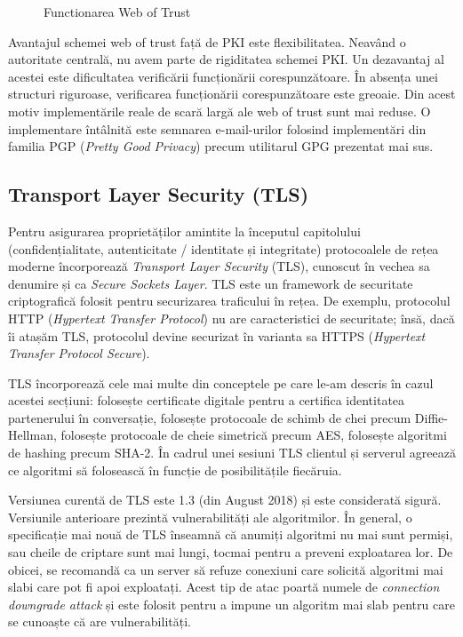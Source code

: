 \begin{figure}[htbp]
  \centering
  \def\svgwidth{\columnwidth}
  
  \caption{Functionarea Web of Trust}
  \label{fig:sec:web-of-trust}
\end{figure}

Avantajul schemei web of trust față de PKI este flexibilitatea. Neavând o autoritate centrală, nu avem parte de rigiditatea schemei PKI. Un dezavantaj al acestei este dificultatea verificării funcționării corespunzătoare. În absența unei structuri riguroase, verificarea funcționării corespunzătoare este greoaie. Din acest motiv implementările reale de scară largă ale web of trust sunt mai reduse. O implementare întâlnită este semnarea e-mail-urilor folosind implementări din familia PGP (\textit{Pretty Good Privacy}) precum utilitarul GPG prezentat mai sus.

\subsection{Transport Layer Security (TLS)}
\label{sec:sec:transfer:tls}

Pentru asigurarea proprietăților amintite la începutul capitolului (confidențialitate, autenticitate / identitate și integritate) protocoalele de rețea moderne încorporează \textit{Transport Layer Security} (TLS), cunoscut în vechea sa denumire și ca \textit{Secure Sockets Layer}. TLS este un framework de securitate criptografică folosit pentru securizarea traficului în rețea. De exemplu, protocolul HTTP (\textit{Hypertext Transfer Protocol}) nu are caracteristici de securitate; însă, dacă îi atașăm TLS, protocolul devine securizat în varianta sa HTTPS (\textit{Hypertext Transfer Protocol Secure}).

TLS încorporează cele mai multe din conceptele pe care le-am descris în cazul acestei secțiuni: folosește certificate digitale pentru a certifica identitatea partenerului în conversație, folosește protocoale de schimb de chei precum Diffie-Hellman, folosește protocoale de cheie simetrică precum AES, folosește algoritmi de hashing precum SHA-2. În cadrul unei sesiuni TLS clientul și serverul agreează ce algoritmi să folosească în funcție de posibilitățile fiecăruia.

Versiunea curentă de TLS este 1.3 (din August 2018) și este considerată sigură. Versiunile anterioare prezintă vulnerabilități ale algoritmilor. În general, o specificație mai nouă de TLS înseamnă că anumiți algoritmi nu mai sunt permiși, sau cheile de criptare sunt mai lungi, tocmai pentru a preveni exploatarea lor. De obicei, se recomandă ca un server să refuze conexiuni care solicită algoritmi mai slabi care pot fi apoi exploatați. Acest tip de atac poartă numele de \textit{connection downgrade attack} și este folosit pentru a impune un algoritm mai slab pentru care se cunoaște că are vulnerabilități.

